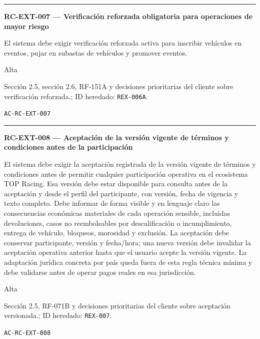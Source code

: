 \documentclass[10pt,letterpaper]{article}
\begin{document}
\vspace{0.25em}\hrule\vspace{0.65em}
\noindent\textbf{RC-EXT-007 --- Verificación reforzada obligatoria para operaciones de mayor riesgo}\par
\begin{description}[style=nextline,leftmargin=3.15cm,labelwidth=2.8cm,font=\normalfont\bfseries]
\item[Obligación] El sistema debe exigir verificación reforzada activa para inscribir vehículos en eventos, pujar en subastas de vehículos y promover eventos.
\item[Prioridad] Alta
\item[Procedencia] Sección 2.5, sección 2.6, RF-151A y decisiones prioritarias del cliente sobre verificación reforzada.; ID heredado: \texttt{REX-006A}.
\item[Verificación] \texttt{AC-RC-EXT-007}
\end{description}
\vspace{0.25em}\hrule\vspace{0.65em}
\noindent\textbf{RC-EXT-008 --- Aceptación de la versión vigente de términos y condiciones antes de la participación}\par
\begin{description}[style=nextline,leftmargin=3.15cm,labelwidth=2.8cm,font=\normalfont\bfseries]
\item[Obligación] El sistema debe exigir la aceptación registrada de la versión vigente de términos y condiciones antes de permitir cualquier participación operativa en el ecosistema TOP Racing. Esa versión debe estar disponible para consulta antes de la aceptación y desde el perfil del participante, con versión, fecha de vigencia y texto completo. Debe informar de forma visible y en lenguaje claro las consecuencias económicas materiales de cada operación sensible, incluidas devoluciones, casos no reembolsables por descalificación o incumplimiento, entrega de vehículo, bloqueos, morosidad y exclusión. La aceptación debe conservar participante, versión y fecha/hora; una nueva versión debe invalidar la aceptación operativa anterior hasta que el usuario acepte la versión vigente. La adaptación jurídica concreta por país queda fuera de esta regla técnica mínima y debe validarse antes de operar pagos reales en esa jurisdicción.
\item[Prioridad] Alta
\item[Procedencia] Sección 2.5, RF-071B y decisiones prioritarias del cliente sobre aceptación versionada.; ID heredado: \texttt{REX-007}.
\item[Verificación] \texttt{AC-RC-EXT-008}
\end{description}
\end{document}
